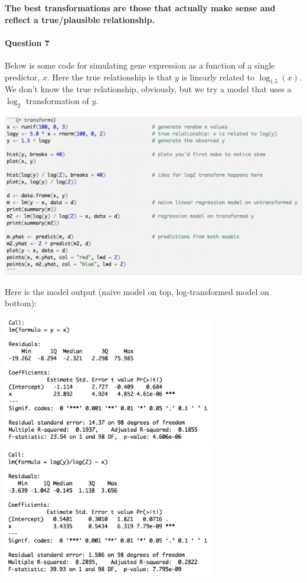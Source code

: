 \textbf{The best transformations are those that actually make sense and reflect a true/plausible relationship.} 

\paragraph{Question 7} Below is some code for simulating gene expression as a function of a single predictor, $x$. Here the true relationship is that $y$ is linearly related to $\log_{1.5}(x)$. We don't know the true relationship, obviously, but we try a model that uses a $\log_2$ transformation of $y$. 
\begin{center}
\includegraphics[width=\textwidth]{img/transform-sim-code.png}
\end{center}

\newpage

Here is the model output (naive model on top, log-transformed model on bottom):
\begin{center}
\includegraphics[width=0.7\textwidth]{img/transform-naive-model.png} \\[5mm]
\includegraphics[width=0.7\textwidth]{img/transform-better-model.png}
\end{center}

